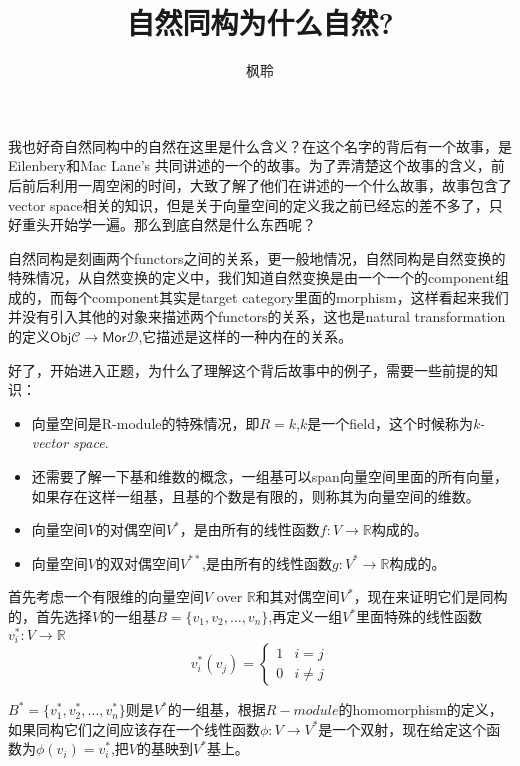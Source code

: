 \documentclass[UTF8,11pt,a4paper]{ctexart}%
\begin{document}
\newcommand*{\xfunc}[4]{{#2}\colon{#3}{#1}{#4}}
\newcommand*{\func}[3]{\xfunc{\to}{#1}{#2}{#3}}
 
\title{自然同构为什么自然?}
\author{枫聆}
\maketitle

我也好奇自然同构中的自然在这里是什么含义？在这个名字的背后有一个故事，是Eilenbery和Mac Lane's 共同讲述的一个的故事。为了弄清楚这个故事的含义，前后前后利用一周空闲的时间，大致了解了他们在讲述的一个什么故事，故事包含了vector space相关的知识，但是关于向量空间的定义我之前已经忘的差不多了，只好重头开始学一遍。那么到底自然是什么东西呢？

自然同构是刻画两个functors之间的关系，更一般地情况，自然同构是自然变换的特殊情况，从自然变换的定义中，我们知道自然变换是由一个一个的component组成的，而每个component其实是target category里面的morphism，这样看起来我们并没有引入其他的对象来描述两个functors的关系，这也是natural transformation的定义$\textsf{Obj}\mathcal{C} \rightarrow \textsf{Mor}\mathcal{D}$,它描述是这样的一种内在的关系。

好了，开始进入正题，为什么了理解这个背后故事中的例子，需要一些前提的知识：

\begin{itemize}
	\item 向量空间是R-module的特殊情况，即$R=k$,$k$是一个field，这个时候称为\textsl{k-vector space}.
	\item 还需要了解一下基和维数的概念，一组基可以span向量空间里面的所有向量，如果存在这样一组基，且基的个数是有限的，则称其为向量空间的维数。
	\item 向量空间$V$的对偶空间$V^{*}$，是由所有的线性函数$\func{f}{V}{\mathbb{R}}$构成的。
	\item 向量空间$V$的双对偶空间$V^{**}$,是由所有的线性函数$\func{g}{V^{*}}{\mathbb{R}}$构成的。
	
\end{itemize}

首先考虑一个有限维的向量空间$V$ over $\mathbb{R}$和其对偶空间$V^{*}$，现在来证明它们是同构的，首先选择$V$的一组基$B=\{v_1,v_2,\ldots,v_n\}$,再定义一组$V^{*}$里面特殊的线性函数$\func{v_i^{*}}{V}{\mathbb{R}}$ 
	\[v_i^{*}(v_j)=\left\{ 
	\begin{array}{rcl}
	1 & i=j \\
	0 & i\neq j
	\end{array}
	\right.
	\]
	
$B^{*}=\{v_1^{*},v_2^{*},\ldots,v_n^{*}\}$则是$V^{*}$的一组基，根据$R-module$的homomorphism的定义，如果同构它们之间应该存在一个线性函数$\func{\phi}{V}{V^{*}}$是一个双射，现在给定这个函数为$\phi(v_i)=v_i^{*}$,把$V$的基映到$V^{*}$基上。
\end{document}
